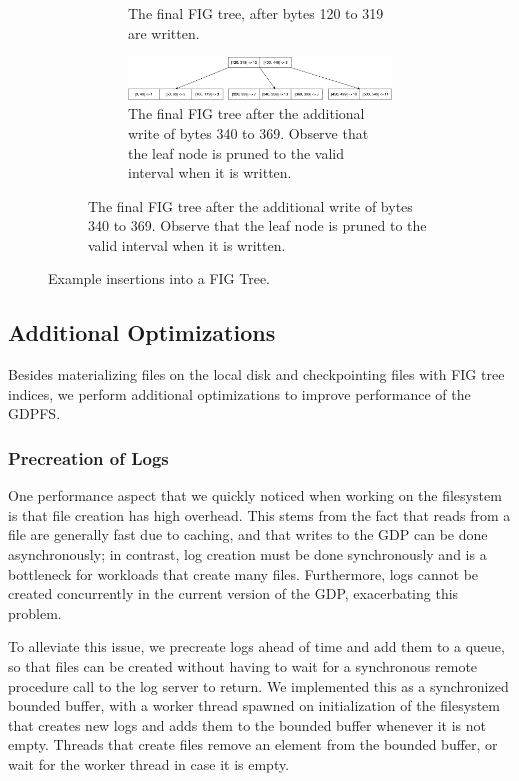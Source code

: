 \documentclass{acm_proc_article-sp}
\begin{document}
\begin{figure}
\begin{subfigure}[b]{0.52\textwidth}
\begin{subfigure}[b]{\textwidth}
            \caption{The final FIG tree, after bytes 120 to 319 are written.}
            \label{fig:afterwritefigtree}
        \end{subfigure}
        \begin{subfigure}[b]{\textwidth}
            \includegraphics[width=\columnwidth]{figtree4.pdf}
            \caption{The final FIG tree after the additional write of bytes 340 to 369. Observe that the leaf node is pruned to the valid interval when it is written.}
            \label{fig:additionalwritefigtree}
        \end{subfigure}
    \end{subfigure}
    \caption{Example insertions into a FIG Tree.}\label{fig:figtree}
\end{figure}

\subsection{Additional Optimizations}
Besides materializing files on the local disk and checkpointing files with FIG tree indices, we perform additional optimizations to improve performance of the GDPFS.

\subsubsection{Precreation of Logs}
One performance aspect that we quickly noticed when working on the filesystem is that file creation has high overhead. This stems from the fact that reads from a file are generally fast due to caching, and that writes to the GDP can be done asynchronously; in contrast, log creation must be done synchronously and is a bottleneck for workloads that create many files. Furthermore, logs cannot be created concurrently in the current version of the GDP, exacerbating this problem.

To alleviate this issue, we precreate logs ahead of time and add them to a queue, so that files can be created without having to wait for a synchronous remote procedure call to the log server to return. We implemented this as a synchronized bounded buffer, with a worker thread spawned on initialization of the filesystem that creates new logs and adds them to the bounded buffer whenever it is not empty. Threads that create files remove an element from the bounded buffer, or wait for the worker thread in case it is empty.
\end{document}
